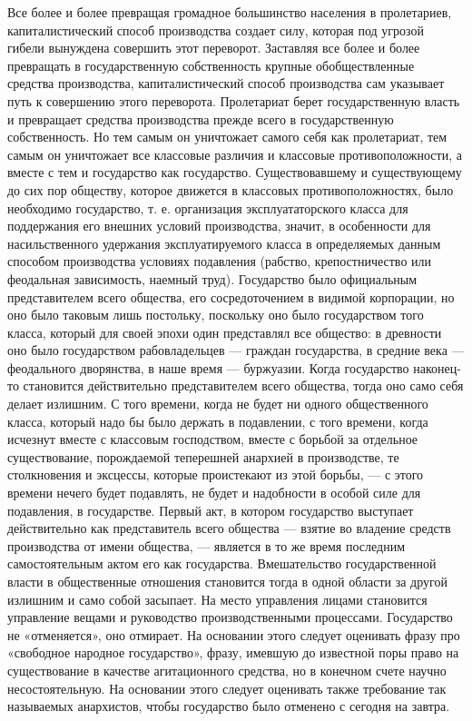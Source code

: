 \documentclass[12pt]{article}
\newcommand{\parnum}{(\arabic{parcount})}
\newcounter{parcount}
\newenvironment{parnumbers}{%
  \par%
  \everypar{\noindent \stepcounter{parcount}\marginpar[]{\parnum}}%
}{}
\begin{document}
\begin{parnumbers}
    Все более и более превращая громадное большинство населения в пролетариев, капиталистический способ производства создает силу, которая под угрозой гибели вынуждена совершить этот переворот. Заставляя все более и более превращать в государственную собственность крупные обобществленные средства производства, капиталистический способ производства сам указывает путь к совершению этого переворота. Пролетариат берет государственную власть и превращает средства производства прежде всего в государственную собственность. Но тем самым он уничтожает самого себя как пролетариат, тем самым он уничтожает все классовые различия и классовые противоположности, а вместе с тем и государство как государство. Существовавшему и существующему до сих пор обществу, которое движется в классовых противоположностях, было необходимо государство, т. е. организация эксплуататорского класса для поддержания его внешних условий производства, значит, в особенности для насильственного удержания эксплуатируемого класса в определяемых данным способом производства условиях подавления (рабство, крепостничество или феодальная зависимость, наемный труд). Государство было официальным представителем всего общества, его сосредоточением в видимой корпорации, но оно было таковым лишь постольку, поскольку оно было государством того класса, который для своей эпохи один представлял все общество: в древности оно было государством рабовладельцев — граждан государства, в средние века — феодального дворянства, в наше время — буржуазии. Когда государство наконец-то становится действительно представителем всего общества, тогда оно само себя делает излишним. С того времени, когда не будет ни одного общественного класса, который надо бы было держать в подавлении, с того времени, когда исчезнут вместе с классовым господством, вместе с борьбой за отдельное существование, порождаемой теперешней анархией в производстве, те столкновения и эксцессы, которые проистекают из этой борьбы, — с этого времени нечего будет подавлять, не будет и надобности в особой силе для подавления, в государстве. Первый акт, в котором государство выступает действительно как представитель всего общества — взятие во владение средств производства от имени общества, — является в то же время последним самостоятельным актом его как государства. Вмешательство государственной власти в общественные отношения становится тогда в одной области за другой излишним и само собой засыпает. На место управления лицами становится управление вещами и руководство производственными процессами. Государство не «отменяется», оно отмирает. На основании этого следует оценивать фразу про «свободное народное государство», фразу, имевшую до известной поры право на существование в качестве агитационного средства, но в конечном счете научно несостоятельную. На основании этого следует оценивать также требование так называемых анархистов, чтобы государство было отменено с сегодня на завтра.


\end{parnumbers}
\end{document}
